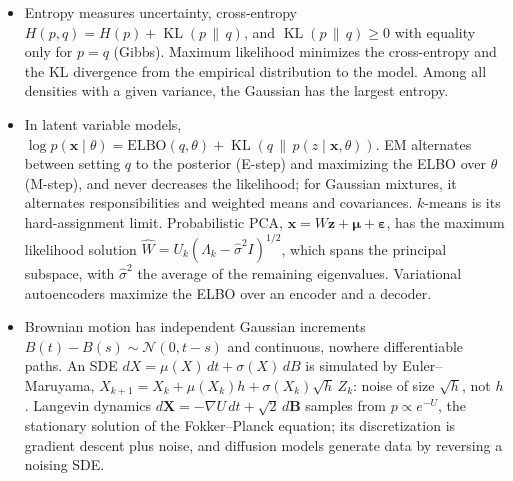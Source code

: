 \documentclass[11pt]{article}
\DeclareMathOperator{\KL}{KL}
\theoremstyle{definition}
\theoremstyle{plain}
\theoremstyle{remark}
\begin{document}
\begin{itemize}[leftmargin=*]
    \item Entropy measures uncertainty, cross-entropy $H(p, q) = H(p) + \KL(p \,\|\, q)$, and $\KL(p \,\|\, q) \geq 0$ with equality only for $p = q$ (Gibbs). Maximum likelihood minimizes the cross-entropy and the KL divergence from the empirical distribution to the model. Among all densities with a given variance, the Gaussian has the largest entropy.
    \item In latent variable models, $\log p(\mathbf{x} \mid \theta) = \mathrm{ELBO}(q, \theta) + \KL(q \,\|\, p(z \mid \mathbf{x}, \theta))$. EM alternates between setting $q$ to the posterior (E-step) and maximizing the ELBO over $\theta$ (M-step), and never decreases the likelihood; for Gaussian mixtures, it alternates responsibilities and weighted means and covariances. $k$-means is its hard-assignment limit. Probabilistic PCA, $\mathbf{x} = W\mathbf{z} + \boldsymbol{\mu} + \boldsymbol{\varepsilon}$, has the maximum likelihood solution $\hat W = U_k(\Lambda_k - \hat\sigma^2I)^{1/2}$, which spans the principal subspace, with $\hat\sigma^2$ the average of the remaining eigenvalues. Variational autoencoders maximize the ELBO over an encoder and a decoder.
    \item Brownian motion has independent Gaussian increments $B(t) - B(s) \sim \mathcal{N}(0, t - s)$ and continuous, nowhere differentiable paths. An SDE $dX = \mu(X)\,dt + \sigma(X)\,dB$ is simulated by Euler--Maruyama, $X_{k+1} = X_k + \mu(X_k)h + \sigma(X_k)\sqrt{h}\,Z_k$: noise of size $\sqrt{h}$, not $h$. Langevin dynamics $d\mathbf{X} = -\nabla U\,dt + \sqrt{2}\,d\mathbf{B}$ samples from $p \propto e^{-U}$, the stationary solution of the Fokker--Planck equation; its discretization is gradient descent plus noise, and diffusion models generate data by reversing a noising SDE.
\end{itemize}
\end{document}
